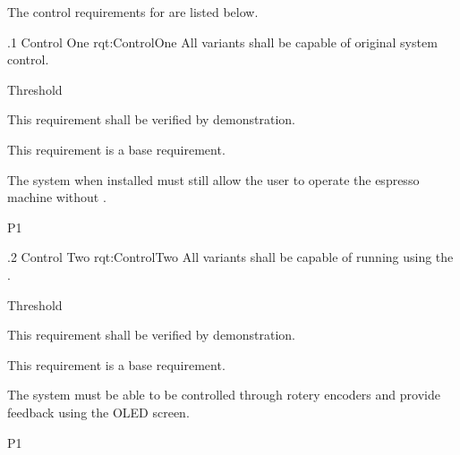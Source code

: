 The control requirements for \ThisSystem are listed below.

\ONERQMTVKPP
{\RqtNumberBase.1}
{Control One}
{rqt:ControlOne}
{All \ThisSys variants shall be capable of original system control.}
{
	\item [Phase 1] Threshold
}
{This requirement shall be verified by demonstration.}
{
	\item [N/A] This requirement is a base requirement.
}
{
  \item The system when installed must still allow the user to operate the espresso machine without \ThisSystem.
}
{P1}

\ONERQMTVKPP
{\RqtNumberBase.2}
{Control Two}
{rqt:ControlTwo}
{All \ThisSys variants shall be capable of running using the \ThisSystem.}
{
	\item [Phase 1] Threshold
}
{This requirement shall be verified by demonstration.}
{
	\item [N/A] This requirement is a base requirement.
}
{
  \item The system must be able to be controlled through rotery encoders and provide feedback using the OLED screen.
}
{P1}
